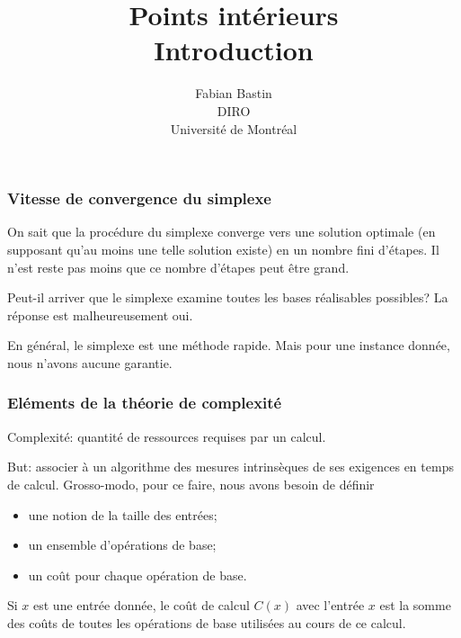 \documentclass[t,usepdftitle=false]{beamer}
\title[Introduction points intérieurs]{Points intérieurs\\Introduction}
\author[Fabian Bastin]{Fabian Bastin\\DIRO\\Université de Montréal}
\date{}
\begin{document}
\frame{\titlepage}


\begin{frame}
\frametitle{Vitesse de convergence du simplexe}

On sait que la procédure du simplexe converge vers une solution optimale (en supposant qu'au moins une telle solution existe) en un nombre fini d'étapes. Il n'est reste pas moins que ce nombre d'étapes peut être grand.



\mbox{}

Peut-il arriver que le simplexe examine toutes les bases réalisables possibles? La réponse est malheureusement oui.

\mbox{}

En général, le simplexe est une méthode rapide. Mais pour une instance donnée, nous n'avons aucune garantie.
\end{frame}

\begin{frame}
\frametitle{Eléments de la théorie de complexité}

Complexité: quantité de ressources requises par un calcul.

\mbox{}

But: associer à un algorithme des mesures intrinsèques de ses exigences en temps de calcul. Grosso-modo, pour ce faire, nous avons besoin de définir
\begin{itemize}
\item
une notion de la taille des entrées;
\item
un ensemble d'opérations de base;
\item
un coût pour chaque opération de base.
\end{itemize}

\mbox{}

Si $x$ est une entrée donnée, le coût de calcul $C(x)$ avec l'entrée $x$ est la somme des coûts de toutes les opérations de base utilisées au cours de ce calcul.

\end{frame}
\end{document}
